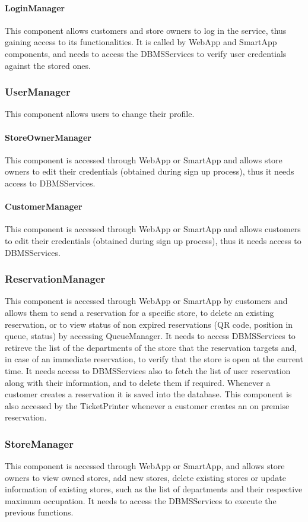 \paragraph{LoginManager}
This component allows customers and store owners to log in the service, thus gaining access to its functionalities. It is called by WebApp and SmartApp components, and needs to access the DBMSServices to verify user credentials against the stored ones.
\subsubsection{UserManager}
This component allows users to change their profile.
\paragraph{StoreOwnerManager}
This component is accessed through WebApp or SmartApp and allows store owners to edit their credentials (obtained during sign up process), thus it needs access to DBMSServices.
\paragraph{CustomerManager}
This component is accessed through WebApp or SmartApp and allows customers to edit their credentials (obtained during sign up process), thus it needs access to DBMSServices.
\subsubsection{ReservationManager}
This component is accessed through WebApp or SmartApp by customers and allows them to send a reservation for a specific store, to delete an existing reservation, or to view status of non expired reservations (QR code, position in queue, status) by accessing QueueManager. It needs to access DBMSServices to retireve the list of the departments of the store that the reservation targets and, in case of an immediate reservation, to verify that the store is open at the current time. It needs access to DBMSServices also to fetch the list of user reservation along with their information, and to delete them if required. Whenever a customer creates a reservation it is saved into the database. This component is also accessed by the TicketPrinter whenever a customer creates an on premise reservation.
\subsubsection{StoreManager}
This component is accessed through WebApp or SmartApp, and allows store owners to view owned stores, add new stores, delete existing stores or update information of existing stores, such as the list of departments and their respective maximum occupation. It needs to access the DBMSServices to execute the previous functions.
